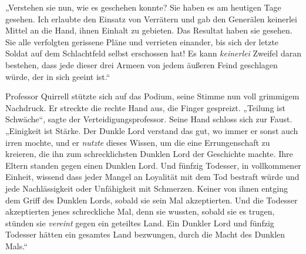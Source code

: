 „Verstehen sie nun, wie es geschehen konnte? Sie haben es am heutigen Tage gesehen. Ich erlaubte den Einsatz von Verrätern und gab den Generälen keinerlei Mittel an die Hand, ihnen Einhalt zu gebieten. Das Resultat haben sie gesehen. Sie alle verfolgten gerissene Pläne und verrieten einander, bis sich der letzte Soldat auf dem Schlachtfeld selbst erschossen hat! Es kann \emph{keinerlei} Zweifel daran bestehen, dass jede dieser drei Armeen von jedem äußeren Feind geschlagen würde, der in sich geeint ist.“

Professor Quirrell stützte sich auf das Podium, seine Stimme nun voll grimmigem Nachdruck. Er streckte die rechte Hand aus, die Finger gespreizt.
„Teilung ist Schwäche“, sagte der Verteidigungsprofessor. Seine Hand schloss sich zur Faust.
„Einigkeit ist Stärke. Der Dunkle Lord verstand das gut, wo immer er sonst auch irren mochte, und er \emph{nutzte} dieses Wissen, um die eine Errungenschaft zu kreieren, die ihn zum schrecklichsten Dunklen Lord der Geschichte machte. Ihre Eltern standen gegen einen Dunklen Lord. Und fünfzig Todesser, in vollkommener Einheit, wissend dass jeder Mangel an Loyalität mit dem Tod bestraft würde und jede Nachlässigkeit oder Unfähigkeit mit Schmerzen. Keiner von ihnen entging dem Griff des Dunklen Lords, sobald sie sein Mal akzeptierten. Und die Todesser akzeptierten jenes schreckliche Mal, denn sie wussten, sobald sie es trugen, stünden sie \emph{vereint} gegen ein geteiltes Land. Ein Dunkler Lord und fünfzig Todesser hätten ein gesamtes Land bezwungen, durch die Macht des Dunklen Mals.“

